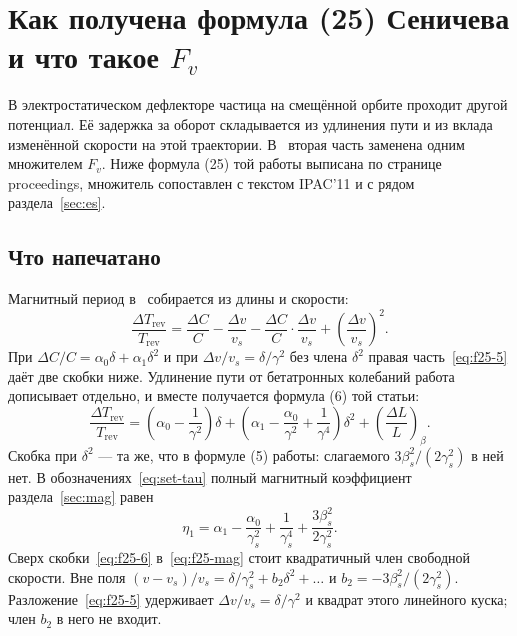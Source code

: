 \section{Как получена формула (25) Сеничева и что такое $F_v$}
\label{sec:f25}

В электростатическом дефлекторе частица на смещённой орбите проходит другой потенциал. Её задержка за оборот складывается из удлинения пути и из вклада изменённой скорости на этой траектории. В~\cite{Senichev2013} вторая часть заменена одним множителем $F_v$. Ниже формула (25) той работы выписана по странице proceedings, множитель сопоставлен с текстом IPAC'11 и с рядом раздела~\ref{sec:es}.

\subsection{Что напечатано}
\label{sec:f25-print}

Магнитный период в~\cite{Senichev2013} собирается из длины и скорости:
\begin{equation}
\label{eq:f25-5}
\frac{\Delta T_{\mathrm{rev}}}{T_{\mathrm{rev}}}
=
\frac{\Delta C}{C}
-
\frac{\Delta v}{v_s}
-
\frac{\Delta C}{C}\cdot\frac{\Delta v}{v_s}
+
\left(\frac{\Delta v}{v_s}\right)^2.
\end{equation}
При $\Delta C/C=\alpha_0\delta+\alpha_1\delta^2$ и при $\Delta v/v_s=\delta/\gamma^2$ без члена $\delta^2$ правая часть~\eqref{eq:f25-5} даёт две скобки ниже. Удлинение пути от бетатронных колебаний работа дописывает отдельно, и вместе получается формула (6) той статьи:
\begin{equation}
\label{eq:f25-6}
\frac{\Delta T_{\mathrm{rev}}}{T_{\mathrm{rev}}}
=
\left(\alpha_0-\frac{1}{\gamma^2}\right)\delta
+
\left(\alpha_1-\frac{\alpha_0}{\gamma^2}+\frac{1}{\gamma^4}\right)\delta^2
+
\left(\frac{\Delta L}{L}\right)_{\!\beta}.
\end{equation}
Скобка при $\delta^2$ --- та же, что в формуле (5) работы: слагаемого $3\beta_s^2/(2\gamma_s^2)$ в ней нет. В обозначениях~\eqref{eq:set-tau} полный магнитный коэффициент раздела~\ref{sec:mag} равен
\begin{equation}
\label{eq:f25-mag}
\eta_1
=
\alpha_1-\frac{\alpha_0}{\gamma_s^2}+\frac{1}{\gamma_s^4}+\frac{3\beta_s^2}{2\gamma_s^2}.
\end{equation}
Сверх скобки~\eqref{eq:f25-6} в~\eqref{eq:f25-mag} стоит квадратичный член свободной скорости. Вне поля $(v-v_s)/v_s=\delta/\gamma_s^2+b_2\delta^2+\ldots$ и $b_2=-3\beta_s^2/(2\gamma_s^2)$. Разложение~\eqref{eq:f25-5} удерживает $\Delta v/v_s=\delta/\gamma^2$ и квадрат этого линейного куска; член $b_2$ в него не входит.

